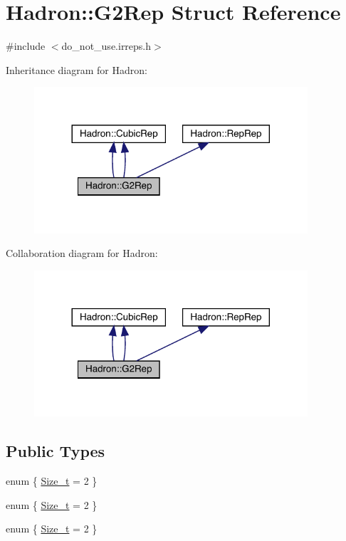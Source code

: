 \hypertarget{structHadron_1_1G2Rep}{}\section{Hadron\+:\+:G2\+Rep Struct Reference}
\label{structHadron_1_1G2Rep}


{\ttfamily \#include $<$do\+\_\+not\+\_\+use.\+irreps.\+h$>$}



Inheritance diagram for Hadron\+:\nopagebreak
\begin{figure}[H]
\begin{center}
\leavevmode
\includegraphics[width=288pt]{d2/d56/structHadron_1_1G2Rep__inherit__graph}
\end{center}
\end{figure}


Collaboration diagram for Hadron\+:\nopagebreak
\begin{figure}[H]
\begin{center}
\leavevmode
\includegraphics[width=288pt]{dd/d5d/structHadron_1_1G2Rep__coll__graph}
\end{center}
\end{figure}
\subsection*{Public Types}
\begin{DoxyCompactItemize}
\item 
enum \{ \mbox{\hyperlink{structHadron_1_1G2Rep_a5e1b9f4542c56aafee97806d019f746cad57403b756f8e944c60ba8b7b2dd6bef}{Size\+\_\+t}} = 2
 \}
\item 
enum \{ \mbox{\hyperlink{structHadron_1_1G2Rep_a5e1b9f4542c56aafee97806d019f746cad57403b756f8e944c60ba8b7b2dd6bef}{Size\+\_\+t}} = 2
 \}
\item 
enum \{ \mbox{\hyperlink{structHadron_1_1G2Rep_a5e1b9f4542c56aafee97806d019f746cad57403b756f8e944c60ba8b7b2dd6bef}{Size\+\_\+t}} = 2
 \}
\end{DoxyCompactItemize}
